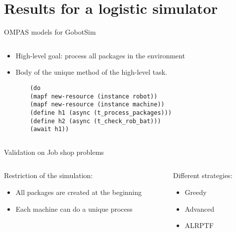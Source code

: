 \section{Results for a logistic simulator}


\begin{frame}[fragile]{OMPAS models for GobotSim}
    \begin{columns}
        \begin{column}{0.5\textwidth}
            \begin{itemize}
                \item High-level goal: process all packages in the environment
                \item Body of the unique method of the high-level task.
                \setlength{\leftmargini}{0pt}
    
                \tiny
            \begin{lstlisting}
    (do
    (mapf new-resource (instance robot))
    (mapf new-resource (instance machine))
    (define h1 (async (t_process_packages)))
    (define h2 (async (t_check_rob_bat)))
    (await h1))
            \end{lstlisting}    
            \end{itemize}
    
    
            
        \end{column}
        \begin{column}{0.5\textwidth}
    \end{column}
    \end{columns}
    
    \end{frame}

\begin{frame}{Validation on Job shop problems}
\centering
\begin{columns}
    \begin{column}{0.5\textwidth}
        Restriction of the simulation:
        \begin{itemize}
            \item All packages are created at the beginning
            \item Each machine can do a unique process
        \end{itemize}
    \end{column}
    \begin{column}{0.5\textwidth}
        Different strategies:
        \begin{itemize}
            \item Greedy
            \item Advanced
            \item ALRPTF
        \end{itemize}
    \end{column}
\end{columns}
\end{frame}

